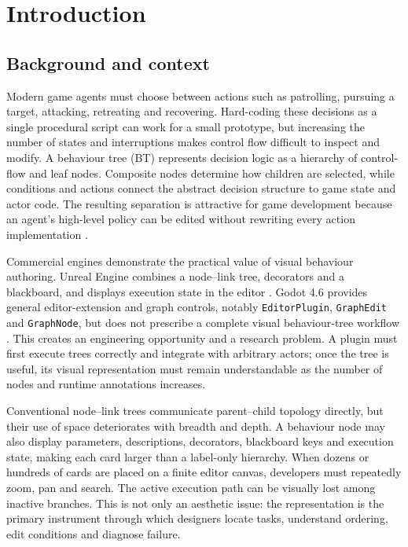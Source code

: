 \chapter{Introduction}
\label{ch:introduction}

\section{Background and context}

Modern game agents must choose between actions such as patrolling, pursuing a target, attacking, retreating and recovering. Hard-coding these decisions as a single procedural script can work for a small prototype, but increasing the number of states and interruptions makes control flow difficult to inspect and modify. A behaviour tree (BT) represents decision logic as a hierarchy of control-flow and leaf nodes. Composite nodes determine how children are selected, while conditions and actions connect the abstract decision structure to game state and actor code. The resulting separation is attractive for game development because an agent's high-level policy can be edited without rewriting every action implementation \parencite{colledanchise2018bt}.

Commercial engines demonstrate the practical value of visual behaviour authoring. Unreal Engine combines a node--link tree, decorators and a blackboard, and displays execution state in the editor \parencite{unrealbt}. Godot 4.6 provides general editor-extension and graph controls, notably \texttt{EditorPlugin}, \texttt{GraphEdit} and \texttt{GraphNode}, but does not prescribe a complete visual behaviour-tree workflow \parencite{godoteditorplugin,godotgraphedit}. This creates an engineering opportunity and a research problem. A plugin must first execute trees correctly and integrate with arbitrary actors; once the tree is useful, its visual representation must remain understandable as the number of nodes and runtime annotations increases.

Conventional node--link trees communicate parent--child topology directly, but their use of space deteriorates with breadth and depth. A behaviour node may also display parameters, descriptions, decorators, blackboard keys and execution state, making each card larger than a label-only hierarchy. When dozens or hundreds of cards are placed on a finite editor canvas, developers must repeatedly zoom, pan and search. The active execution path can be visually lost among inactive branches. This is not only an aesthetic issue: the representation is the primary instrument through which designers locate tasks, understand ordering, edit conditions and diagnose failure.


